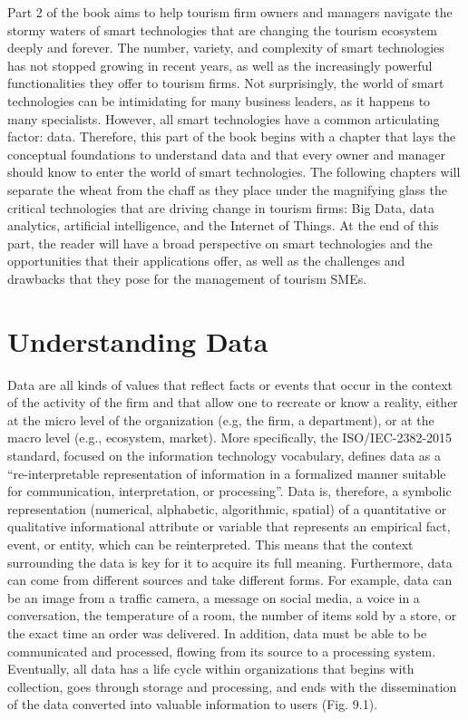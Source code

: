 \documentclass[
  letterpaper,
  DIV=11,
  numbers=noendperiod]{scrreprt}
\begin{document}
Part 2 of the book aims to help tourism firm owners and managers
navigate the stormy waters of smart technologies that are changing the
tourism ecosystem deeply and forever. The number, variety, and
complexity of smart technologies has not stopped growing in recent
years, as well as the increasingly powerful functionalities they offer
to tourism firms. Not surprisingly, the world of smart technologies can
be intimidating for many business leaders, as it happens to many
specialists. However, all smart technologies have a common articulating
factor: data. Therefore, this part of the book begins with a chapter
that lays the conceptual foundations to understand data and that every
owner and manager should know to enter the world of smart technologies.
The following chapters will separate the wheat from the chaff as they
place under the magnifying glass the critical technologies that are
driving change in tourism firms: Big Data, data analytics, artificial
intelligence, and the Internet of Things. At the end of this part, the
reader will have a broad perspective on smart technologies and the
opportunities that their applications offer, as well as the challenges
and drawbacks that they pose for the management of tourism SMEs.

\hypertarget{understanding-data}{%
\chapter{Understanding Data}\label{understanding-data}}

Data are all kinds of values that reflect facts or events that occur in
the context of the activity of the firm and that allow one to recreate
or know a reality, either at the micro level of the organization (e.g,
the firm, a department), or at the macro level (e.g., ecosystem,
market). More specifically, the ISO/IEC-2382-2015 standard, focused on
the information technology vocabulary, defines data as a
``re-interpretable representation of information in a formalized manner
suitable for communication, interpretation, or processing''. Data is,
therefore, a symbolic representation (numerical, alphabetic,
algorithmic, spatial) of a quantitative or qualitative informational
attribute or variable that represents an empirical fact, event, or
entity, which can be reinterpreted. This means that the context
surrounding the data is key for it to acquire its full meaning.
Furthermore, data can come from different sources and take different
forms. For example, data can be an image from a traffic camera, a
message on social media, a voice in a conversation, the temperature of a
room, the number of items sold by a store, or the exact time an order
was delivered. In addition, data must be able to be communicated and
processed, flowing from its source to a processing system. Eventually,
all data has a life cycle within organizations that begins with
collection, goes through storage and processing, and ends with the
dissemination of the data converted into valuable information to users
(Fig. 9.1).
\end{document}
